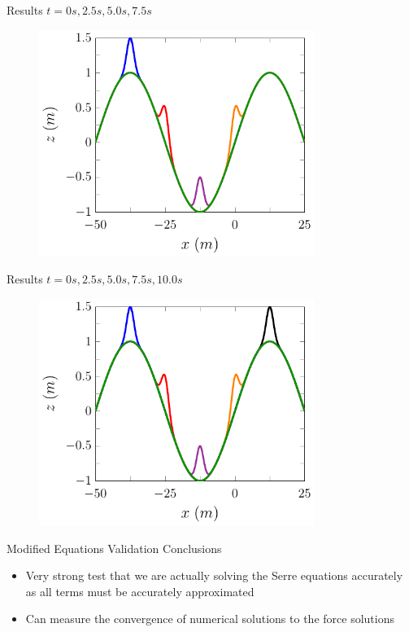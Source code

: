 \documentclass[pdf]{beamer}
\begin{document}
\begin{frame}{Results $t=0s,2.5s,5.0s,7.5s$}
	\begin{figure}
		\includegraphics[width=0.8\textwidth]{./Pics/DryBed/Forced/Stages0255075.pdf}
	\end{figure}
\end{frame}

\begin{frame}{Results $t=0s,2.5s,5.0s,7.5s,10.0s$}
	\begin{figure}
		\includegraphics[width=0.8\textwidth]{./Pics/DryBed/Forced/Stages0255075100.pdf}
	\end{figure}
\end{frame}

\begin{frame}{Modified Equations Validation Conclusions}
\begin{itemize}
	\item Very strong test that we are actually solving the Serre equations accurately as all terms must be accurately approximated
	\item Can measure the convergence of numerical solutions to the force solutions
\end{itemize}
\end{frame}
\end{document}
